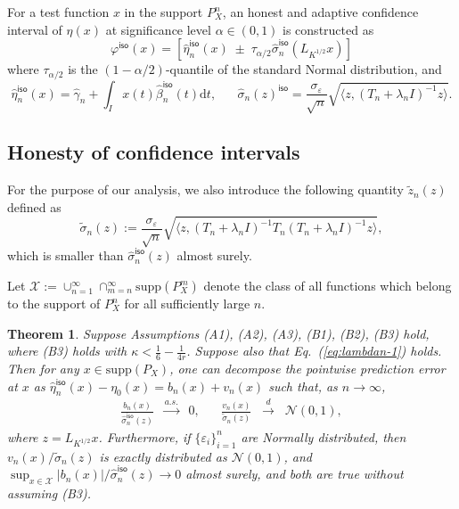 \documentclass[11pt,a4paper]{article}
\renewcommand{\hat}{\widehat}
\renewcommand{\tilde}{\widetilde}
\theoremstyle{definition}
\theoremstyle{plain}
\newtheorem{theorem}{Theorem}[section]
\theoremstyle{remark}
\newcommand{\supp}{\mathrm{supp}}
\newcommand{\mX}{\mathcal X}
\newcommand{\ud}{\mathrm d}
\newcommand{\iso}{\mathsf{iso}}
\begin{document}
For a test function $x$ in the support $P_X^n$, an honest and adaptive confidence interval of $\eta(x)$ at significance level $\alpha\in(0,1)$ is constructed as
$$
\varphi^\iso(x) = [\hat\eta_n^\iso(x)\;\pm\;\tau_{\alpha/2}\hat\sigma_n^\iso(L_{K^{1/2}}x)]
$$
where $\tau_{\alpha/2}$ is the $(1-\alpha/2)$-quantile of the standard Normal distribution, and
$$
\hat\eta_n^\iso(x) = \hat\gamma_n + \int_I x(t)\hat\beta_n^\iso(t)\ud t,\;\;\;\;\;\;\hat\sigma_n(z)^\iso = \frac{\sigma_\varepsilon}{\sqrt{n}}\sqrt{\langle z, (T_n+\lambda_n I)^{-1}z\rangle}.
$$

\subsection{Honesty of confidence intervals}

For the purpose of our analysis, 
we also introduce the following quantity $\tilde z_n(z)$ defined as
$$
\tilde\sigma_n(z) := \frac{\sigma_\varepsilon}{\sqrt{n}}\sqrt{\langle z, (T_n+\lambda_n I)^{-1}T_n(T_n+\lambda_n I)^{-1}z\rangle},
$$
which is smaller than $\hat\sigma_n^\iso(z)$ almost surely.

Let $\mX := \cup_{n=1}^{\infty}\cap_{m=n}^{\infty}\supp(P_X^m)$ denote the class of all functions which belong to the support of $P_X^n$ for all sufficiently large $n$.

\begin{theorem}
Suppose Assumptions (A1), (A2), (A3), (B1), (B2), (B3) hold, where (B3) holds with $\kappa<\frac{1}{6}-\frac{1}{4r}$. Suppose also that Eq.~(\ref{eq:lambdan-1}) holds. Then 
for any $x\in\supp(P_X)$, one can decompose the pointwise prediction error at $x$ as $\hat\eta_n^\iso(x)-\eta_0(x)=b_n(x)+v_n(x)$ such that, as $n\to\infty$, 
\begin{align*}
\frac{b_n(x)}{\hat\sigma_n^\iso(z)}\;\;\overset{a.s.}{\to}\;\; 0,\;\;\;\;\;\;\frac{v_n(x)}{\tilde\sigma_n(z)}\;\;\overset{d}{\to}\;\;\mathcal N(0,1),
\end{align*}
where $z=L_{K^{1/2}}x$.
Furthermore, if $\{\varepsilon_i\}_{i=1}^n$ are Normally distributed, then $v_n(x)/\tilde\sigma_n(z)$ is exactly distributed as $\mathcal N(0,1)$, and
$\sup_{x\in\mX}|b_n(x)|/\hat\sigma_n^{\iso}(z)\to 0$ almost surely, and both are true without assuming (B3).
\label{thm:isokrr-limiting}
\end{theorem}
\end{document}

